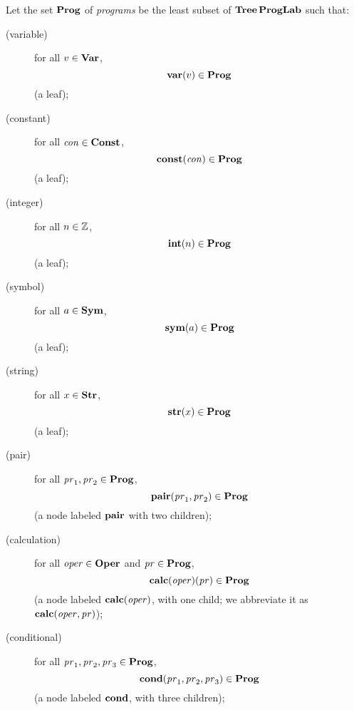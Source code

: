 %
%
%
Let the set $\mathbf{Prog}$ of \emph{programs} be the least subset
of $\mathbf{Tree}\,\mathbf{ProgLab}$ such that:
\begin{description}
\item[\quad(variable)] for all $v\in\mathbf{Var}$,
  \begin{displaymath}
    \mathbf{var}(v)\in\mathbf{Prog}
  \end{displaymath}
  (a leaf);

\item[\quad(constant)] for all $\mathit{con}\in\mathbf{Const}$,
  \begin{displaymath}
   \mathbf{const}(\mathit{con})\in\mathbf{Prog} 
  \end{displaymath}
  (a leaf);

\item[\quad(integer)] for all $n\in\mathbb{Z}$, 
  \begin{displaymath}
    \mathbf{int}(n)\in\mathbf{Prog}
  \end{displaymath}
  (a leaf);

\item[\quad(symbol)] for all $a\in\mathbf{Sym}$,
  \begin{displaymath}
    \mathbf{sym}(a)\in\mathbf{Prog}
  \end{displaymath}
  (a leaf);

\item[\quad(string)] for all $x\in\mathbf{Str}$,
  \begin{displaymath}
    \mathbf{str}(x)\in\mathbf{Prog}    
  \end{displaymath}
  (a leaf);

\item[\quad(pair)] for all $\mathit{pr}_1,\mathit{pr}_2\in\mathbf{Prog}$,
  \begin{displaymath}
   \mathbf{pair}(\mathit{pr}_1,\mathit{pr}_2)\in\mathbf{Prog} 
  \end{displaymath}
  (a node labeled $\mathbf{pair}$ with two children);

\item[\quad(calculation)] for all $\mathit{oper}\in\mathbf{Oper}$ and
  $\mathit{pr}\in\mathbf{Prog}$,
  \begin{displaymath}
    \mathbf{calc}(\mathit{oper})(\mathit{pr})\in\mathbf{Prog}    
  \end{displaymath}
  (a node labeled $\mathbf{calc}(\mathit{oper})$, with one child; we abbreviate it as
  $\mathbf{calc}(\mathit{oper},\mathit{pr})$);

\item[\quad(conditional)] for all $\mathit{pr}_1,\mathit{pr}_2,\mathit{pr}_3\in\mathbf{Prog}$,
  \begin{displaymath}
   \mathbf{cond}(\mathit{pr}_1,\mathit{pr}_2,\mathit{pr}_3)\in\mathbf{Prog} 
  \end{displaymath}
  (a node labeled $\mathbf{cond}$, with three children);


\end{description}
